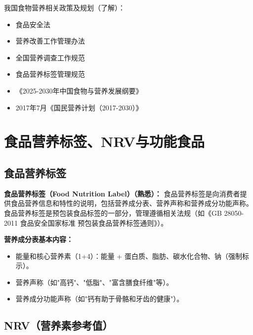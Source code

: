 我国食物营养相关政策及规划（了解）：
\begin{itemize}[leftmargin=*]
    \item 食品安全法
    \item 营养改善工作管理办法
    \item 全国营养调查工作规范
    \item 食品营养标签管理规范
    \item 《2025-2030年中国食物与营养发展纲要》
    \item 2017年7月《国民营养计划（2017-2030）》
\end{itemize}

\section{食品营养标签、NRV与功能食品}

\subsection{食品营养标签}

\begin{defbox}
\textbf{食品营养标签（Food Nutrition Label）（熟悉）：}
食品营养标签是向消费者提供食品营养信息和特性的说明，包括营养成分表、营养声称和营养成分功能声称。食品营养标签是预包装食品标签的一部分，管理遵循相关法规（如《GB 28050-2011 食品安全国家标准 预包装食品营养标签通则》）。%

\textbf{营养成分表基本内容：}
\begin{itemize}[leftmargin=*]
    \item 能量和核心营养素（1+4）：能量 + 蛋白质、脂肪、碳水化合物、钠（强制标示）。
    \item 营养声称（如"高钙"、"低脂"、"富含膳食纤维"等）。
    \item 营养成分功能声称（如"钙有助于骨骼和牙齿的健康"）。
\end{itemize}
\end{defbox}

\subsection{NRV（营养素参考值）}

